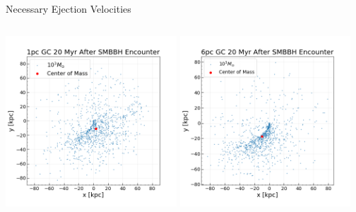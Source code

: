 \documentclass[aspectratio=169]{beamer}
\begin{document}
\begin{frame}
  {Necessary Ejection Velocities}
  \begin{columns}
    \includegraphics[width=6.4cm, height=6.4cm]{./Images/1pc20Myr_scatter.png}
    \centering
    \includegraphics[width=6.4cm, height=6.4cm]{./Images/6pc20Myr_scatter.png}
    \centering
  \end{columns}
\end{frame}
\end{document}
